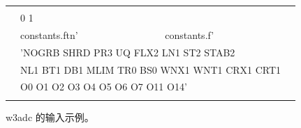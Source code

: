 \setlength{\unitlength}{0.1mm}

\begin{figure}

\begin{center} {\code \begin{tabular}{|cllc|} \hline
 & & &  \\
 & \multicolumn{2}{l}{0 1}        & \\ 
 & constants.ftn' & constants.f'  & \\
 & \multicolumn{2}{l}{'NOGRB SHRD PR3 UQ FLX2 LN1 ST2 STAB2}& \\
 & \multicolumn{2}{l}{\strut\hspace{5mm} NL1 BT1 DB1 MLIM TR0 BS0 WNX1 WNT1 CRX1 CRT1 }& \\
 & \multicolumn{2}{l}{\strut\hspace{5mm} O0 O1 O2 O3 O4 O5 O6 O7 O11 O14'}& \\
 &               &             & \\ \hline
\end{tabular} } \end{center} 
\caption{{\F w3adc} 的输入示例。} \label{fig:w3adc}

\botline
\end{figure}
